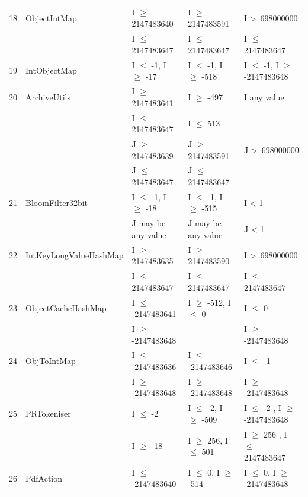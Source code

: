 {\begin{longtable}{|l|l|l|l|l|}
18	& ObjectIntMap				& I $\ge$ 2147483640			& I $\ge$ 2147483591			& I \textgreater~698000000					\\ 
	&                                             & I $\le$ 2147483647			& I $\le$ 2147483647			& I $\le$ 2147483647					\\	
19	& IntObjectMap				& I $\le$ -1, I $\ge$ -17			& I $\le$ -1, I $\ge$ -518			& I $\le$ -1, I $\ge$ -2147483648\\ 
20	& ArchiveUtils				& I $\ge$ 2147483641			& I $\ge$ -497					& I any value									\\ 
	&							& I $\le$ 2147483647			& I $\le$ 513					& 											\\ 
	&                                             & J $\ge$ 2147483639			& J $\ge$ 2147483591			& J \textgreater~698000000 	   				\\
	&                                             & J $\le$ 2147483647			&  J $\le$ 2147483647			&  	   										\\
21	& BloomFilter32bit 			& I $\le$ -1, I $\ge$ -18			& I $\le$ -1, I $\ge$ -515			& I \textless -1 								\\ 
	&                                             & J may be any value				& J may be any value				& J \textless -1 			   					\\	
22	& IntKeyLongValueHashMap	& I $\ge$ 2147483635			& I $\ge$ 2147483590			& I \textgreater~698000000					\\ 
	&                                             & I $\le$ 2147483647			& I $\le$ 2147483647			& I $\le$ 2147483647					\\	
23	& ObjectCacheHashMap		& I $\le$ -2147483641			& I $\ge$ -512, I $\le$ 0			& I $\le$ 0								\\ 
	&                                             & I $\ge$ -2147483648			& 								& I $\ge$ -2147483648				\\	
24	& ObjToIntMap				& I $\le$ -2147483636			& I $\le$ -2147483646			& I $\le$ -1								\\ 
	&                                             & I $\ge$ -2147483648			& I $\ge$ -2147483648			& I $\ge$ -2147483648			   	\\	
25	& PRTokeniser				& I $\le$ -2						& I $\le$ -2, I $\ge$ -509			& I $\le$ -2 , I $\ge$ -2147483648\\ 
	&                                             & I $\ge$ -18					& I $\ge$ 256, I $\le$ 501		& I $\ge$ 256	, I $\le$ 2147483647\\
26	& PdfAction					& I $\le$ -2147483640 			& I $\le$ 0, I $\ge$ -514			& I $\le$ 0, I $\ge$ -2147483648 	\\ 

\end{longtable}}

